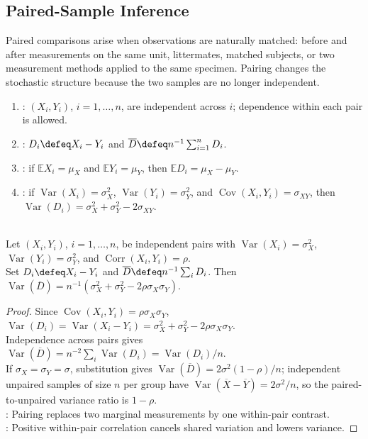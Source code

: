 \subsection{Paired-Sample Inference}

Paired comparisons arise when observations are naturally matched: before and after measurements on the same unit, littermates, matched subjects, or two measurement methods applied to the same specimen.  Pairing changes the stochastic structure because the two samples are no longer independent.

\begin{definition} \label{def:paired-sample-differences} 
\begin{enumerate}[label=(\roman*)]
\setlength{\itemsep}{0pt}
\item {}: $(X_i,Y_i)$, $i=1,\ldots,n$, are independent across $i$; dependence within each pair is allowed.
\item {}: $D_i\defeq X_i-Y_i$ and $\overline{D}\defeq n^{-1}\sum_{i=1}^nD_i$.
\item {}: if $\mathbb{E}X_i=\mu_X$ and $\mathbb{E}Y_i=\mu_Y$, then $\mathbb{E}D_i=\mu_X-\mu_Y$.
\item {}: if $\operatorname{Var}(X_i)=\sigma_X^2$, $\operatorname{Var}(Y_i)=\sigma_Y^2$, and $\operatorname{Cov}(X_i,Y_i)=\sigma_{XY}$, then $\operatorname{Var}(D_i)=\sigma_X^2+\sigma_Y^2-2\sigma_{XY}$.
\end{enumerate}
\end{definition}

\begin{proposition} \label{prop:pairing-variance-reduction} \\
Let $(X_i,Y_i)$, $i=1,\ldots,n$, be independent pairs with $\operatorname{Var}(X_i)=\sigma_X^2$, $\operatorname{Var}(Y_i)=\sigma_Y^2$, and $\operatorname{Corr}(X_i,Y_i)=\rho$.\\
Set $D_i\defeq X_i-Y_i$ and $\overline{D}\defeq n^{-1}\sum_iD_i$. Then $\operatorname{Var}(\overline{D})=n^{-1}(\sigma_X^2+\sigma_Y^2-2\rho\sigma_X\sigma_Y)$.
\begin{proof} Since $\operatorname{Cov}(X_i,Y_i)=\rho\sigma_X\sigma_Y$, $\operatorname{Var}(D_i)=\operatorname{Var}(X_i-Y_i)=\sigma_X^2+\sigma_Y^2-2\rho\sigma_X\sigma_Y$.\\
Independence across pairs gives $\operatorname{Var}(\overline{D})=n^{-2}\sum_i\operatorname{Var}(D_i)=\operatorname{Var}(D_i)/n$.\\
If $\sigma_X=\sigma_Y=\sigma$, substitution gives $\operatorname{Var}(\overline{D})=2\sigma^2(1-\rho)/n$; independent unpaired samples of size $n$ per group have $\operatorname{Var}(\overline{X}-\overline{Y})=2\sigma^2/n$, so the paired-to-unpaired variance ratio is $1-\rho$.\\
: Pairing replaces two marginal measurements by one within-pair contrast.\\
: Positive within-pair correlation cancels shared variation and lowers variance.
\end{proof}
\end{proposition}

